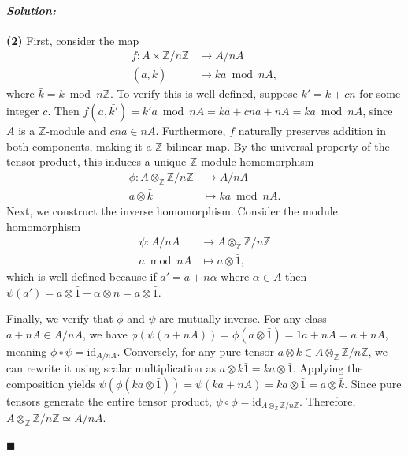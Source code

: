 \documentclass[12pt, a4paper]{article}
\newenvironment{solution}
  {\paragraph{\textit{Solution:}}\par\medskip}
  {\hfill$\blacksquare$\vspace{0.1cm}}
\begin{document}
\begin{solution}
     \textbf{(2)} First, consider the map
     \begin{align*}
        f: A \times \mathbb{Z}/n\mathbb{Z} &\to A/nA \\
        (a, \bar{k}) &\mapsto ka\bmod nA,
     \end{align*} 
    where $\bar{k} = k\bmod n\mathbb{Z}$. To verify this is well-defined, suppose $k' = k + cn$ for some integer $c$. Then $f(a,\bar{k'}) = k'a \bmod nA = ka + cna + nA=ka\bmod nA $, since $A$ is a $\mathbb{Z}$-module and $cna \in nA$.
    Furthermore, $f$ naturally preserves addition in both components, making it a $\mathbb{Z}$-bilinear map. 
    By the universal property of the tensor product, this induces a unique $\mathbb{Z}$-module homomorphism 
    \begin{align*}
        \phi: A \otimes_{\mathbb{Z}} \mathbb{Z}/n\mathbb{Z} &\to A/nA \\
        a \otimes \bar{k} &\mapsto ka \bmod nA.
    \end{align*}
    Next, we construct the inverse homomorphism. 
    Consider the module homomorphism
    \begin{align*}
        \psi:A/nA &\to A \otimes_{\mathbb{Z}} \mathbb{Z}/n\mathbb{Z}\\
        a \bmod nA&\mapsto a \otimes \bar{1},
    \end{align*}
    which is well-defined because if $a'=a+n\alpha$ where $\alpha\in A$ then $\psi(a') = a \otimes \bar{1} + \alpha \otimes \bar{n} = a \otimes \bar{1}$. 

    Finally, we verify that $\phi$ and $\psi$ are mutually inverse. 
    For any class $a + nA \in A/nA$, we have $\phi(\psi(a + nA)) = \phi(a \otimes \bar{1}) = 1a + nA = a + nA$, meaning $\phi \circ \psi = \text{id}_{A/nA}$. Conversely, for any pure tensor $a \otimes \bar{k} \in A \otimes_{\mathbb{Z}} \mathbb{Z}/n\mathbb{Z}$, we can rewrite it using scalar multiplication as $a \otimes k\bar{1} = ka \otimes \bar{1}$. Applying the composition yields $\psi(\phi(ka \otimes \bar{1})) = \psi(ka + nA) = ka \otimes \bar{1} = a \otimes \bar{k}$. Since pure tensors generate the entire tensor product, $\psi \circ \phi = \text{id}_{A \otimes_{\mathbb{Z}} \mathbb{Z}/n\mathbb{Z}}$. Therefore, $A \otimes_{\mathbb{Z}} \mathbb{Z}/n\mathbb{Z} \simeq A/nA$.


\end{solution}
\end{document}
